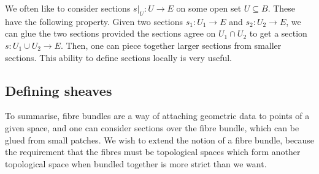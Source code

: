 We often like to consider sections $s\vert_U:U\to E$ on some open set
$U\subseteq B$. These have the following property.
Given two sections $s_{1}:U_{1}\to E$ and $s_{2}:U_{2}\to E$, we can 
glue the two sections provided the sections
agree on $U_{1}\cap U_{2}$ to get a section $s:U_{1}\cup U_{2}\to E$.
Then, one can piece together larger sections from smaller sections. This
ability to define sections locally is very useful.

\subsection{Defining sheaves}
To summarise, fibre bundles are a way of attaching geometric data to
points of a given space, and one can consider sections over the fibre
bundle, which can be glued from small patches. We wish to extend the notion
of a fibre bundle, because the requirement that the fibres must be
topological spaces which form another topological space when bundled
together is more strict than we want.

